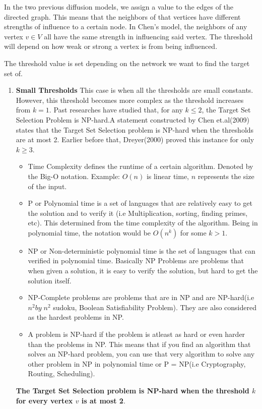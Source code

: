 In the two previous diffusion models, we assign a value to the edges of the directed graph. This means that the neighbors of that vertices have different strengths of influence to a certain node. In Chen's model, the neighbors of any vertex $v \in V$ all have the same strength in influencing said vertex. The threshold will depend on how weak or strong a vertex is from being influenced. 

The threshold value is set depending on the network we want to find the target set of.

\begin{enumerate}
	\item \textbf{Small Thresholds} This case is when all the thresholds are small constants. However, this threshold becomes more complex as the threshold increases from $k=1$. Past researches have studied that, for any $k \leq 2$, the Target Set Selection Problem is NP-hard.A statement constructed by Chen et.al(2009) states that the Target Set Selection problem is NP-hard when the thresholds are at most 2. Earlier before that, Dreyer(2000) proved this instance for only $k \geq 3$.\cite{dreyer} \cite{NPhardness} 
	\begin{itemize}
	\item Time Complexity defines the runtime of a certain algorithm. Denoted by the Big-O notation. Example: $O(n)$ is linear time, $n$ represents the size of the input.
	\item P or Polynomial time is a set of languages that are relatively easy to get the solution and to verify it (i.e Multiplication, sorting, finding primes, etc). This determined from the time complexity of the algorithm. Being in polynomial time, the notation would be $O(n^k)$ for some $k>1$.
	\item NP or Non-deterministic polynomial time is the set of languages that can verified in polynomial time. Basically NP Problems are problems that when given a solution, it is easy to verify the solution, but hard to get the solution itself.
	\item NP-Complete problems are problems that are in NP and are NP-hard(i.e $n^{2}by\; n^{2}$ sudoku, Boolean Satisfiability Problem). They are also considered as the hardest problems in NP.
	\item A problem is NP-hard if the problem is atleast as hard or even harder than the problems in NP. This means that if you find an algorithm that solves an NP-hard problem, you can use that very algorithm to solve any other problem in NP in polynomial time or P = NP(i.e Cryptography, Routing, Scheduling).  
\end{itemize} 
\textbf{The Target Set Selection problem is NP-hard when the threshold $k$ for every vertex $v$ is at most 2}. \cite{chen,dreyer}


\end{enumerate}
